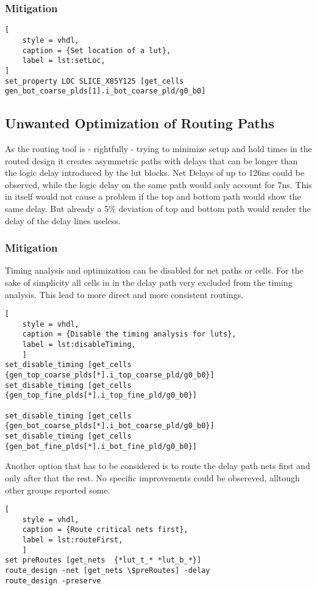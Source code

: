 \subsubsection{Mitigation}
\begin{lstlisting}[
	style = vhdl,
	caption = {Set location of a lut},
	label = lst:setLoc,
]
set_property LOC SLICE_X85Y125 [get_cells gen_bot_coarse_plds[1].i_bot_coarse_pld/g0_b0]
\end{lstlisting}

 
\subsection{Unwanted Optimization of Routing Paths}
As the routing tool is - rightfully - trying to minimize setup and hold times in the
routed design it creates asymmetric paths with delays that can be longer than the
logic delay introduced by the lut blocks. Net Delays of up to 126ns could be observed,
while the logic delay on the same path would only account for 7ns. 
This in itself would not cause a problem if the top and bottom path would show the same
delay. But already a 5\% deviation of top and bottom path would render the delay of
the delay lines useless.

\subsubsection{Mitigation}
Timing analysis and optimization can be disabled for net paths or cells. For the sake of
simplicity all cells in in the delay path very excluded from the timing analysis.
This lead to more direct and more consistent routings. 

\begin{lstlisting}[
	style = vhdl,
	caption = {Disable the timing analysis for luts},
	label = lst:disableTiming,
	]
set_disable_timing [get_cells {gen_top_coarse_plds[*].i_top_coarse_pld/g0_b0}]
set_disable_timing [get_cells {gen_top_fine_plds[*].i_top_fine_pld/g0_b0}]

set_disable_timing [get_cells {gen_bot_coarse_plds[*].i_bot_coarse_pld/g0_b0}]
set_disable_timing [get_cells {gen_bot_fine_plds[*].i_bot_fine_pld/g0_b0}]
\end{lstlisting}

Another option that has to be considered is to route the delay path nets first and only
after that the rest. No specific improvements could be obsereved, alltough other groups
reported some.

\begin{lstlisting}[
	style = vhdl,
	caption = {Route critical nets first},
	label = lst:routeFirst,
	]
set preRoutes [get_nets  {*lut_t_* *lut_b_*}]
route_design -net [get_nets \$preRoutes] -delay
route_design -preserve
\end{lstlisting}

